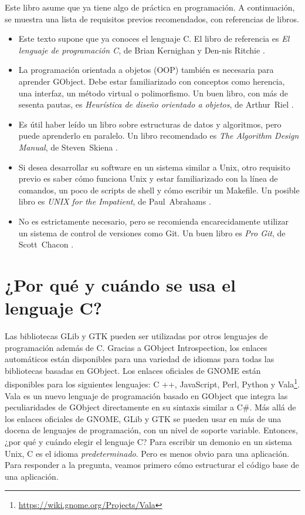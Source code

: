 Este libro asume que ya tiene algo de práctica en programación. A continuación, se muestra una lista de requisitos previos recomendados, con referencias de libros.

\begin{itemize}
    \item Este texto supone que ya conoces el lenguaje C. El libro de referencia es \emph{El lenguaje de programación C}, de Brian Kernighan y Den-nis Ritchie \cite{k-r-book}.
    
    \item La programación orientada a objetos (OOP) también es necesaria para aprender GObject. Debe estar familiarizado con conceptos como herencia, una interfaz, un método virtual o polimorfismo. Un buen libro, con más de sesenta pautas, es \emph{Heurística de diseño orientado a objetos}, de Arthur~Riel \cite{oop-book}.
    
    \item Es útil haber leído un libro sobre estructuras de datos y algoritmos, pero puede aprenderlo en paralelo. Un libro recomendado es \emph{The Algorithm Design Manual}, de Steven~Skiena \cite{algo-book}.
    
    \item Si desea desarrollar su software en un sistema similar a Unix, otro requisito previo es saber cómo funciona Unix y estar familiarizado con la línea de comandos, un poco de scripts de shell y cómo escribir un Makefile. Un posible libro es \emph{UNIX for the Impatient}, de Paul~Abrahams \cite{unix-impatient}.
    
    \item No es estrictamente necesario, pero se recomienda encarecidamente utilizar un sistema de control de versiones como Git. Un buen libro es \emph{Pro Git}, de Scott~Chacon \cite{pro-git}.
\end{itemize}

\section{¿Por qué y cuándo se usa el lenguaje C?}

Las bibliotecas GLib y GTK pueden ser utilizadas por otros lenguajes de programación además de C. Gracias a GObject Introspection, los enlaces automáticos están disponibles para una variedad de idiomas para todas las bibliotecas basadas en GObject. Los enlaces oficiales de GNOME están disponibles para los siguientes lenguajes: C ++, JavaScript, Perl, Python y Vala\footnote{\url{https://wiki.gnome.org/Projects/Vala}}. Vala es un nuevo lenguaje de programación basado en GObject que integra las peculiaridades de GObject directamente en su sintaxis similar a C\#. Más allá de los enlaces oficiales de GNOME, GLib y GTK se pueden usar en más de una docena de lenguajes de programación, con un nivel de soporte variable. Entonces, ¿por qué y cuándo elegir el lenguaje C? Para escribir un demonio en un sistema Unix, C es el idioma \emph{predeterminado}. Pero es menos obvio para una aplicación. Para responder a la pregunta, veamos primero cómo estructurar el código base de una aplicación.

